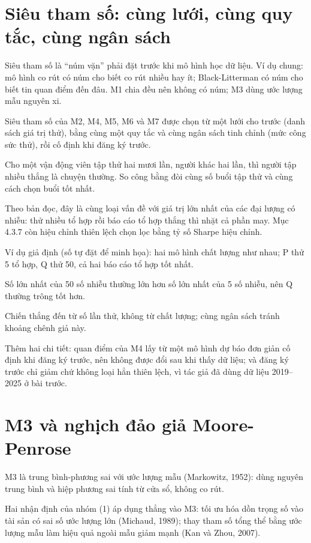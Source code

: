\section{Siêu tham số: cùng lưới, cùng quy tắc, cùng ngân sách}

Siêu tham số là “núm vặn” phải đặt trước khi mô hình học dữ liệu. Ví dụ chung: mô hình co rút có núm cho biết co rút nhiều hay ít; Black-Litterman có núm cho biết tin quan điểm đến đâu. M1 chia đều nên không có núm; M3 dùng ước lượng mẫu nguyên xi.

Siêu tham số của M2, M4, M5, M6 và M7 được chọn từ một lưới cho trước (danh sách giá trị thử), bằng cùng một quy tắc và cùng ngân sách tinh chỉnh (mức công sức thử), rồi cố định khi đăng ký trước.

Cho một vận động viên tập thử hai mươi lần, người khác hai lần, thì người tập nhiều thắng là chuyện thường. So công bằng đòi cùng số buổi tập thử và cùng cách chọn buổi tốt nhất.

Theo bản đọc, đây là cùng loại vấn đề với giá trị lớn nhất của các đại lượng có nhiễu: thử nhiều tổ hợp rồi báo cáo tổ hợp thắng thì nhặt cả phần may. Mục 4.3.7 còn hiệu chỉnh thiên lệch chọn lọc bằng tỷ số Sharpe hiệu chỉnh.

\begin{tcolorbox}[breakable]
Ví dụ giả định (số tự đặt để minh họa): hai mô hình chất lượng như nhau; P thử 5 tổ hợp, Q thử 50, cả hai báo cáo tổ hợp tốt nhất.

Số lớn nhất của 50 số nhiễu thường lớn hơn số lớn nhất của 5 số nhiễu, nên Q thường trông tốt hơn.

Chiến thắng đến từ số lần thử, không từ chất lượng; cùng ngân sách tránh khoảng chênh giả này.
\end{tcolorbox}

Thêm hai chi tiết: quan điểm của M4 lấy từ một mô hình dự báo đơn giản cố định khi đăng ký trước, nên không được đổi sau khi thấy dữ liệu; và đăng ký trước chỉ giảm chứ không loại hẳn thiên lệch, vì tác giả đã dùng dữ liệu 2019--2025 ở bài trước.

\section{M3 và nghịch đảo giả Moore-Penrose}

M3 là trung bình-phương sai với ước lượng mẫu (Markowitz, 1952): dùng nguyên trung bình và hiệp phương sai tính từ cửa sổ, không co rút.

Hai nhận định của nhóm (1) áp dụng thẳng vào M3: tối ưu hóa dồn trọng số vào tài sản có sai số ước lượng lớn (Michaud, 1989); thay tham số tổng thể bằng ước lượng mẫu làm hiệu quả ngoài mẫu giảm mạnh (Kan và Zhou, 2007).

